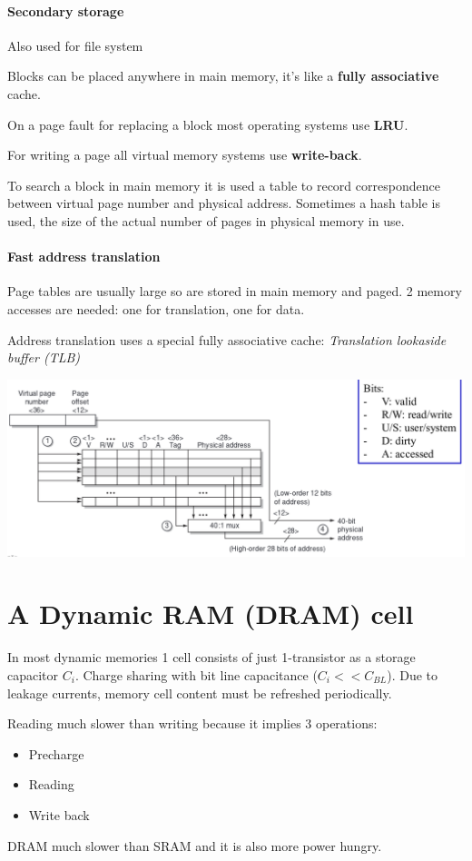 \paragraph{Secondary storage}
Also used for file system

Blocks can be placed anywhere in main memory, it's like a \textbf{fully associative} cache.

On a page fault for replacing a block most operating systems use \textbf{LRU}.

For writing a page all virtual memory systems use \textbf{write-back}.

To search a block in main memory it is used a table to record correspondence between virtual page number and physical address.
Sometimes a hash table is used, the size of the actual number of pages in physical memory in use.

\paragraph{Fast address translation}
Page tables are usually large so are stored in main memory and paged.
2 memory accesses are needed: one for translation, one for data.

Address translation uses a special fully associative cache: \textit{Translation lookaside buffer (TLB)}

\includegraphics[width=\textwidth]{images/TLB_scheme.png}

\section{A Dynamic RAM (DRAM) cell}
In most dynamic memories 1 cell consists of just 1-transistor as a storage capacitor $C_i$.
Charge sharing with bit line capacitance ($C_i << C_{BL}$).
Due to leakage currents, memory cell content must be refreshed periodically.

Reading much slower than writing because it implies 3 operations:
\begin{itemize}
    \item Precharge
    \item Reading
    \item Write back
\end{itemize}
DRAM much slower than SRAM and it is also more power hungry.

